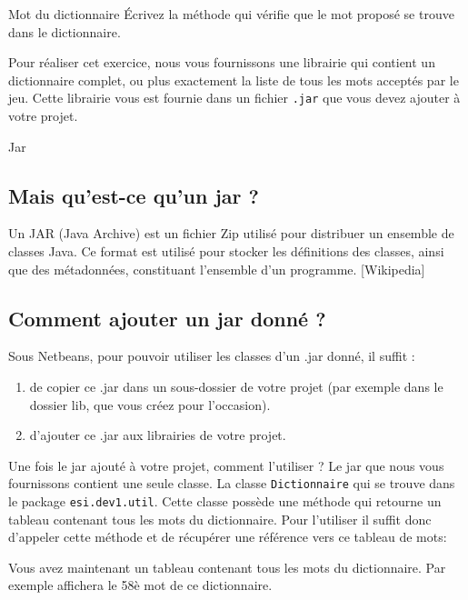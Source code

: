 \documentclass[a4paper,11pt]{style-esi/td}
\begin{document}
 	\begin{Exercice}{Mot du dictionnaire}
 	 			\'Ecrivez la méthode 
		qui vérifie que le mot proposé se trouve dans le dictionnaire.
				
		Pour réaliser cet exercice, nous vous fournissons une librairie qui contient 
		un dictionnaire complet, ou plus exactement la liste de tous les mots
		acceptés par le jeu. Cette librairie vous est fournie dans un fichier
		 \texttt{.jar} que vous devez ajouter à votre projet.	
		 
		\begin{infoit}{Jar}	
		\subsection*{Mais qu’est-ce qu’un jar ?}
			Un JAR (Java Archive) est un fichier Zip utilisé pour distribuer un 
			ensemble de classes Java. Ce format est utilisé pour stocker les 
			définitions des classes, ainsi que des métadonnées, constituant 
			l’ensemble d’un programme. [Wikipedia]
		
		\medskip
		\subsection*{Comment ajouter un jar donné ?}
			Sous Netbeans, pour pouvoir utiliser les classes d’un .jar donné, il suffit :
			\begin{enumerate}
				\item de copier ce .jar dans un sous-dossier de votre projet (par exemple
					dans le dossier lib, que vous créez pour l’occasion).
				\item d’ajouter ce .jar aux librairies de votre projet.
			\end{enumerate}
		\end{infoit}	

	Une fois le jar ajouté à votre projet, comment l'utiliser ?
			Le jar que nous vous fournissons contient une seule classe.
			La classe \texttt{Dictionnaire} qui se trouve dans le package 
			\texttt{esi.dev1.util}. Cette classe possède une méthode 
			 qui retourne un tableau contenant tous les mots
			du dictionnaire. Pour l'utiliser il suffit donc d'appeler cette méthode
			et de récupérer une référence vers ce tableau de mots:
			
			
			Vous avez maintenant un tableau contenant tous les mots du dictionnaire.
			Par exemple  affichera 
			le 58è mot de ce dictionnaire.

			
	\end{Exercice} 
\end{document}
